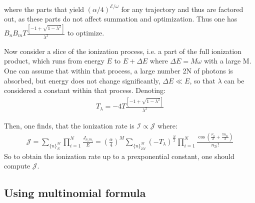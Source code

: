 where the parts that yield $ (\alpha/4)^{\mathcal{E}/\omega} $ for any trajectory and thus are factored out, as these parts do not affect summation and optimization. Thus one has $ B_{n}B_{m}T\frac{\left[-1+\sqrt{1-\lambda^{2}}\right]}{\lambda^{2}} $ to optimize.

Now consider a slice of the ionization process, i.e. a part of the full ionization product, which runs from energy $ E $ to $ E+\Delta E $ where $ \Delta E=M\omega $ with a large M. One can assume that within that process, a large number 2N of photons is absorbed, but energy does not change significantly, $ \Delta E\ll E $, so that $ \lambda $ can be considered a constant within that process. Denoting:
\begin{gather}
	T_{\lambda}=-4T\frac{\left[-1+\sqrt{1-\lambda^{2}}\right]}{\lambda^{2}}
\end{gather}

Then, one finds, that the ionization rate is $ \mathcal{I}\propto\mathcal{J} $ where:
\begin{gather}
\mathcal{J}=\sum_{\{n\}_{N}^{M}}\prod_{i=1}^{N}\frac{J_{n_{i}m_{i}}}{E}=\left(\frac{\alpha}{4}\right)^{M}\sum_{\{n\}_{2N}^{M}}(-T_{\lambda})^{\frac{N}{2}}\prod_{i=1}^{N}\frac{\cos(\frac{\varphi_{0}}{2}+\frac{\pi n_{2i}}{2})}{n_{2i}!}
\end{gather}
So to obtain the ionization rate up to a prexponential constant, one should compute $ \mathcal{J} $.

\subsection{Using multinomial formula}